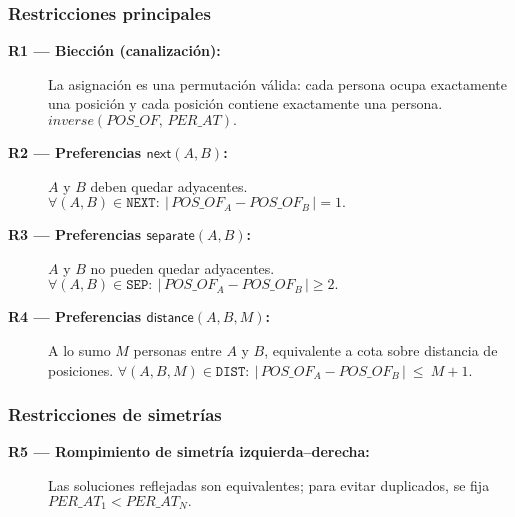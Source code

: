 \subsubsection*{Restricciones principales}
\begin{description}
  \item[\textbf{R1 — Biección (canalización):}] La asignación es una permutación válida: cada persona ocupa exactamente una posición y cada posición contiene exactamente una persona. \(\textit{inverse}(POS\_OF,\,PER\_AT).\)
  \item[\textbf{R2 — Preferencias \(\textsf{next}(A,B)\):}] \(A\) y \(B\) deben quedar adyacentes. \(\forall (A,B)\in \texttt{NEXT}:\ \big|\,POS\_OF_A - POS\_OF_B\,\big| = 1.\)
  \item[\textbf{R3 — Preferencias \(\textsf{separate}(A,B)\):}] \(A\) y \(B\) no pueden quedar adyacentes. \(\forall (A,B)\in \texttt{SEP}:\ \big|\,POS\_OF_A - POS\_OF_B\,\big| \ge 2.\)
  \item[\textbf{R4 — Preferencias \(\textsf{distance}(A,B,M)\):}] A lo sumo \(M\) personas entre \(A\) y \(B\), equivalente a cota sobre distancia de posiciones. \(\forall (A,B,M)\in \texttt{DIST}:\ \big|\,POS\_OF_A - POS\_OF_B\,\big|\ \le\ M+1.\)
\end{description}
\subsubsection*{Restricciones de simetrías}
\begin{description}
  \item[\textbf{R5 — Rompimiento de simetría izquierda–derecha:}] Las soluciones reflejadas son equivalentes; para evitar duplicados, se fija \(PER\_AT_1<PER\_AT_N.\)
\end{description}

